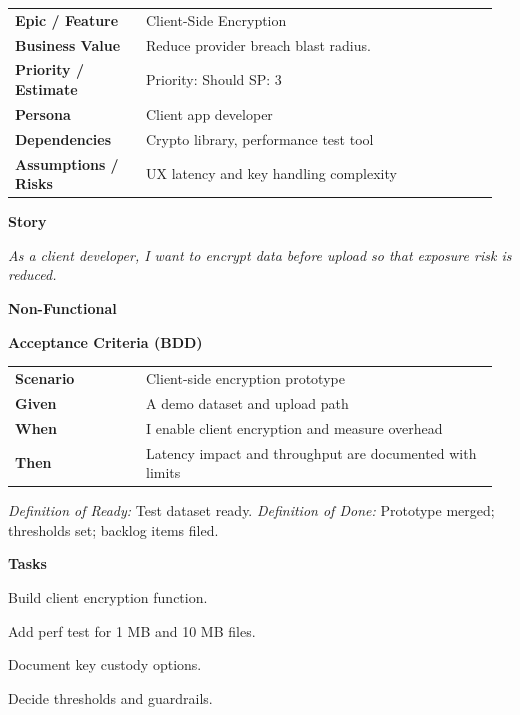 \documentclass[11pt,letterpaper]{article}
\makeatletter
\newenvironment{kvtable}{%
  \par\noindent\begin{tabular}{@{}>{\raggedright\bfseries\arraybackslash}p{0.26\linewidth} >{\raggedright\arraybackslash}p{0.70\linewidth}@{}}
}{\end{tabular}\par}
\newenvironment{bdd}{%
  \par\noindent\begin{tabular}{@{}>{\raggedright\bfseries\arraybackslash}p{0.26\linewidth} >{\raggedright\arraybackslash}p{0.70\linewidth}@{}}
}{\end{tabular}\par}
\newcommand{\DoRDoD}[2]{%
  \vspace{0.35em}
  {\footnotesize\color{Muted}%
    \textit{Definition of Ready:} #1 \; \textbullet\;
    \textit{Definition of Done:} #2%
  }%
}
\newenvironment{storycard}[2]{%
  \begin{tcolorbox}[cloudcard, title={#1 --- #2}]%
}{\end{tcolorbox}}
\newcommand{\sectionlabel}[1]{\par\vspace{0.35em}\textbf{#1}\par}
\makeatother
\begin{document}
\begin{storycard}{CCS-13}{Ch. 13 — User-Side Key Controls}
\begin{kvtable}
Epic / Feature & Client-Side Encryption\\
Business Value & Reduce provider breach blast radius.\\
Priority / Estimate & Priority: Should \quad SP: 3\\
Persona & Client app developer\\
Dependencies & Crypto library, performance test tool\\
Assumptions / Risks & UX latency and key handling complexity\\
\end{kvtable}
\sectionlabel{Story}
\textit{As a client developer, I want to encrypt data before upload so that exposure risk is reduced.}
\sectionlabel{Non-Functional}\;\;
\sectionlabel{Acceptance Criteria (BDD)}
\begin{bdd}
Scenario & Client-side encryption prototype\\
Given & A demo dataset and upload path\\
When & I enable client encryption and measure overhead\\
Then & Latency impact and throughput are documented with limits\\
\end{bdd}
\DoRDoD{Test dataset ready.}{Prototype merged; thresholds set; backlog items filed.}
\sectionlabel{Tasks}
\begin{checklist}
\item Build client encryption function.
\item Add perf test for 1 MB and 10 MB files.
\item Document key custody options.
\item Decide thresholds and guardrails.
\end{checklist}
\end{storycard}
\end{document}

